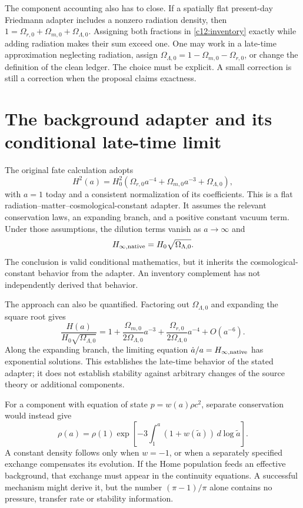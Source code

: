The component accounting also has to close. If a spatially flat present-day Friedmann adapter includes a nonzero radiation density, then $1=\Omega_{r,0}+\Omega_{m,0}+\Omega_{\Lambda,0}$. Assigning both fractions in \eqref{c12:inventory} exactly while adding radiation makes their sum exceed one. One may work in a late-time approximation neglecting radiation, assign $\Omega_{\Lambda,0}=1-\Omega_{m,0}-\Omega_{r,0}$, or change the definition of the clean ledger. The choice must be explicit. A small correction is still a correction when the proposal claims exactness.

\section{The background adapter and its conditional late-time limit}
The original fate calculation adopts
\begin{equation}
 H^2(a)=H_0^2\left(\Omega_{r,0}a^{-4}
              +\Omega_{m,0}a^{-3}+\Omega_{\Lambda,0}\right),
 \label{c12:friedmann}
\end{equation}
with $a=1$ today and a consistent normalization of its coefficients. This is a flat radiation--matter--cosmological-constant adapter. It assumes the relevant conservation laws, an expanding branch, and a positive constant vacuum term. Under those assumptions, the dilution terms vanish as $a\to\infty$ and
\begin{equation}
 H_{\infty,\rm native}=H_0\sqrt{\Omega_{\Lambda,0}}.
 \label{c12:hinfinity}
\end{equation}
The conclusion is valid conditional mathematics, but it inherits the cosmological-constant behavior from the adapter. An inventory complement has not independently derived that behavior.

The approach can also be quantified. Factoring out $\Omega_{\Lambda,0}$ and expanding the square root gives
\begin{equation}
 \frac{H(a)}{H_0\sqrt{\Omega_{\Lambda,0}}}
 =1+\frac{\Omega_{m,0}}{2\Omega_{\Lambda,0}}a^{-3}
   +\frac{\Omega_{r,0}}{2\Omega_{\Lambda,0}}a^{-4}+O(a^{-6}).
 \label{c12:approach}
\end{equation}
Along the expanding branch, the limiting equation $\dot a/a=H_{\infty,\rm native}$ has exponential solutions. This establishes the late-time behavior of the stated adapter; it does not establish stability against arbitrary changes of the source theory or additional components.

For a component with equation of state $p=w(a)\rho c^2$, separate conservation would instead give
\begin{equation}
 \rho(a)=\rho(1)\exp\left[-3\int_1^a(1+w(\widetilde a))
                                      \,d\log\widetilde a\right].
 \label{c12:darkenergy}
\end{equation}
A constant density follows only when $w=-1$, or when a separately specified exchange compensates its evolution. If the Home population feeds an effective background, that exchange must appear in the continuity equations. A successful mechanism might derive it, but the number $(\pi-1)/\pi$ alone contains no pressure, transfer rate or stability information.

